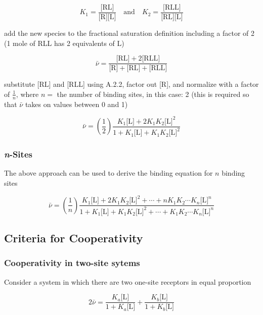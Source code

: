 \begin{equation}
K_1 = \frac{\text{[RL]}}{\text{[R][L]}} \quad \text{and} \quad K_2 = \frac{\text{[RLL]}}{\text{[RL][L]}}
\end{equation}

add the new species to the fractional saturation definition including a factor of 2 (1 mole of RLL has 2 equivalents of L)

\begin{equation}
	\bar{\nu} = \frac{\text{[RL]} + 2 \text{[RLL]}}{\text{[R]} + \text{[RL]} + \text{[RLL]}}
\end{equation}

substitute [RL] and [RLL] using A.2.2, factor out [R], and normalize with a factor of \(\frac{1}{n}\), where \(n = \) the number of binding sites, in this case: 2 (this is required so that \(\bar{\nu}\) takes on values between 0 and 1)

\begin{equation}
	\bar{\nu} = \left(\frac{1}{2}\right) \frac{K_1 \text{[L]} + 2 K_1 K_2 \text{[L]}^2}{1 + K_1 \text{[L]} + K_1 K_2 \text{[L]}^2}
\end{equation}

\subsubsection*{\emph{n}-Sites}

The above approach can be used to derive the binding equation for \(n\) binding sites

\begin{equation}
	\bar{\nu} = \left(\frac{1}{n}\right) \frac{K_1 \text{[L]} + 2 K_1 K_2 \text{[L]}^2 + \cdots + n K_1 K_2 \cdots K_n \text{[L]}^n}{1 + K_1 \text{[L]} + K_1 K_2 \text{[L]}^2 + \cdots + K_1 K_2 \cdots K_n \text{[L]}^n}
\end{equation}

\subsection{Criteria for Cooperativity}

\subsubsection*{Cooperativity in two-site sytems}

Consider a system in which there are two one-site receptors in equal proportion

\begin{equation}
	2  \bar{\nu} = \frac{K_a \text{[L]}}{1+K_a \text{[L]}} + \frac{K_b \text{[L]}}{1+K_b \text{[L]}}
\end{equation}

